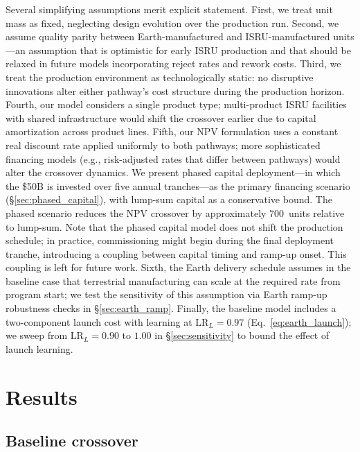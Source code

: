 \documentclass[preprint,12pt]{elsarticle}
\begin{document}
Several simplifying assumptions merit explicit statement. First, we treat unit mass as fixed, neglecting design evolution over the production run. Second, we assume quality parity between Earth-manufactured and ISRU-manufactured units---an assumption that is optimistic for early ISRU production and that should be relaxed in future models incorporating reject rates and rework costs. Third, we treat the production environment as technologically static: no disruptive innovations alter either pathway's cost structure during the production horizon. Fourth, our model considers a single product type; multi-product ISRU facilities with shared infrastructure would shift the crossover earlier due to capital amortization across product lines. Fifth, our NPV formulation uses a constant real discount rate applied uniformly to both pathways; more sophisticated financing models (e.g., risk-adjusted rates that differ between pathways) would alter the crossover dynamics. We present phased capital deployment---in which the \$50B is invested over five annual tranches---as the primary financing scenario (\S\ref{sec:phased_capital}), with lump-sum capital as a conservative bound. The phased scenario reduces the NPV crossover by approximately 700~units relative to lump-sum. Note that the phased capital model does not shift the production schedule; in practice, commissioning might begin during the final deployment tranche, introducing a coupling between capital timing and ramp-up onset. This coupling is left for future work. Sixth, the Earth delivery schedule assumes in the baseline case that terrestrial manufacturing can scale at the required rate from program start; we test the sensitivity of this assumption via Earth ramp-up robustness checks in \S\ref{sec:earth_ramp}. Finally, the baseline model includes a two-component launch cost with learning at $\mathrm{LR}_L = 0.97$ (Eq.~\ref{eq:earth_launch}); we sweep from $\mathrm{LR}_L = 0.90$ to $1.00$ in \S\ref{sec:sensitivity} to bound the effect of launch learning.

\section{Results}
\label{sec:results}

\subsection{Baseline crossover}
\end{document}
